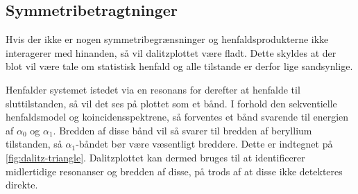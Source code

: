\subsection{Symmetribetragtninger}
\label{sec:symbetragt}

Hvis der ikke er nogen symmetribegrænsninger og henfaldsprodukterne ikke interagerer med hinanden,
så vil dalitzplottet være fladt. Dette skyldes at der blot vil være tale om statistisk henfald og
alle tilstande er derfor lige sandsynlige.

Henfalder systemet istedet via en resonans for derefter at henfalde til sluttilstanden, så vil det
ses på plottet som et bånd. I forhold den sekventielle henfaldsmodel og koincidensspektrene, så
forventes et bånd svarende til energien af $\alpha_{0}$ og $\alpha_{1}$. Bredden af disse bånd vil så svarer
til bredden af beryllium tilstanden, så $\alpha_{1}$-båndet bør være væsentligt breddere. Dette er
indtegnet på \cref{fig:dalitz-triangle}. Dalitzplottet kan dermed bruges til at identificerer
midlertidige resonanser og bredden af disse, på trods af at disse ikke detekteres direkte.














